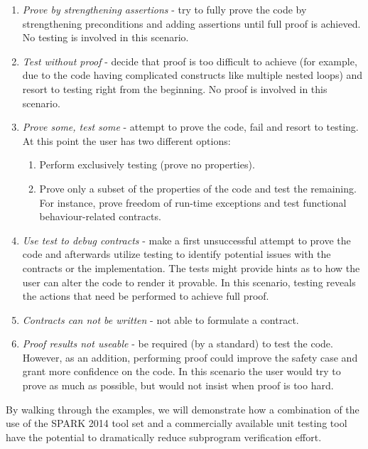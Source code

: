 \documentclass{llncs}
\begin{document}
\begin {enumerate}
\item \emph{Prove by strengthening assertions} - try to fully prove
  the code by strengthening preconditions and adding assertions until
  full proof is achieved. No testing is involved in this scenario.

\item \emph{Test without proof} - decide that proof is too difficult
  to achieve (for example, due to the code having complicated
  constructs like multiple nested loops) and resort to testing right
  from the beginning. No proof is involved in this scenario.

\item \emph{Prove some, test some} - attempt to prove the code, fail
  and resort to testing. At this point the user has two different
  options:

  \begin{enumerate}
  \item Perform exclusively testing (prove no properties).

  \item Prove only a subset of the properties of the code and test the
    remaining. For instance, prove freedom of run-time exceptions and
    test functional behaviour-related contracts.
  \end{enumerate}

\item \emph{Use test to debug contracts} - make a first unsuccessful
  attempt to prove the code and afterwards utilize testing to identify
  potential issues with the contracts or the implementation. The tests
  might provide hints as to how the user can alter the code to render
  it provable. In this scenario, testing reveals the actions that need
  be performed to achieve full proof. 

\item \emph{Contracts can not be written} - not able to formulate a
  contract. 

\item \emph{Proof results not useable} - be required (by a standard)
  to test the code. However, as an addition, performing proof could
  improve the safety case and grant more confidence on the code. In
  this scenario the user would try to prove as much as possible, but
  would not insist when proof is too hard.

\end{enumerate}


By walking through the examples, we will demonstrate how a combination
of the use of the SPARK 2014 tool set and a commercially available unit 
testing tool have the potential to dramatically reduce subprogram 
verification effort.
\end{document}
